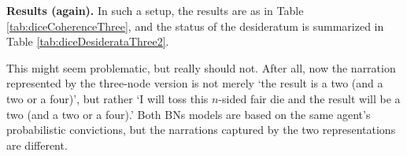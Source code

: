 \documentclass[
  10pt,
]{scrartcl}
\begin{document}
\textbf{Results (again).} In such a setup, the results are as in Table \ref{tab:diceCoherenceThree}, and the status of the desideratum is summarized in Table \ref{tab:diceDesiderataThree2}.

\begin{table}[H]

\caption{\label{tab:diceCoherenceThree}Coherence scores for a regular die and a dodecahedron in the dice problem with three nodes (rounded).}
\centering
{}
\end{table}

\begin{table}[H]

\caption{\label{tab:diceDesiderataThree2}Desideratum satisfaction for three-node BNs in the dice problem.}
\centering
{}
\end{table}

\noindent This might seem problematic, but really should not. After all, now the narration represented by the three-node version is not merely `the result is a two (and a two or a four)', but rather `I will toss this \(n\)-sided fair die and the result will be a two (and a two or a four).' Both BNs models are based on the same agent's probabilistic convictions, but the narrations captured by the two representations are different.
\end{document}
